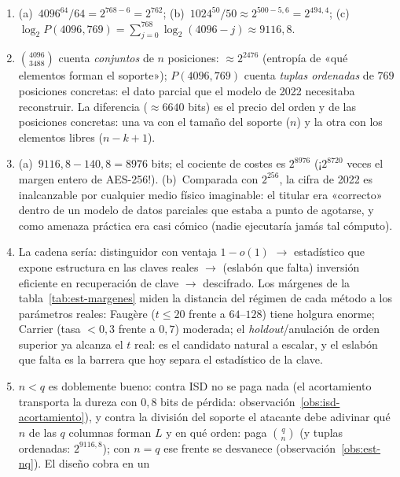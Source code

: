 \begin{enumerate}[leftmargin=1.9em,itemsep=4pt]
  \item (a)~$4096^{64}/64=2^{768-6}=2^{762}$;
        (b)~$1024^{50}/50\approx2^{500-5{,}6}=2^{494{,}4}$;
        (c)~$\log_2P(4096,769)=\sum_{j=0}^{768}\log_2(4096-j)
        \approx9116{,}8$.
  \item $\binom{4096}{3488}$ cuenta \emph{conjuntos} de $n$
        posiciones: $\approx2^{2476}$ (entropía de «qué elementos
        forman el soporte»); $P(4096,769)$ cuenta \emph{tuplas
        ordenadas} de $769$ posiciones concretas: el dato parcial
        que el modelo de 2022 necesitaba reconstruir. La diferencia
        ($\approx6640$ bits) es el precio del orden y de las
        posiciones concretas: una va con el tamaño del soporte
        ($n$) y la otra con los elementos libres ($n-k+1$).
  \item (a)~$9116{,}8-140{,}8=8976$ bits; el cociente de costes es
        $2^{8976}$ (¡$2^{8720}$ veces el margen entero de
        AES-256!). (b)~Comparada con $2^{256}$, la cifra de 2022 es
        inalcanzable por cualquier medio físico imaginable: el
        titular era «correcto» dentro de un modelo de datos
        parciales que estaba a punto de agotarse, y como amenaza
        práctica era casi cómico (nadie ejecutaría jamás tal
        cómputo).
  \item La cadena sería: distinguidor con ventaja $1-o(1)$
        $\to$ estadístico que expone estructura en las claves
        reales $\to$ (eslabón que falta) inversión eficiente en
        recuperación de clave $\to$ descifrado. Los márgenes de
        la tabla~\ref{tab:est-margenes} miden la distancia del régimen de
        cada método a los parámetros reales: Faugère ($t\le20$
        frente a $64$--$128$) tiene holgura enorme; Carrier
        (tasa $<0{,}3$ frente a $0{,}7$) moderada; el
        \emph{holdout}/anulación de orden superior ya alcanza el
        $t$ real: es el candidato natural a escalar, y el eslabón
        que falta es la barrera que hoy separa el estadístico de
        la clave.
  \item $n<q$ es doblemente bueno: contra ISD no se paga nada
        (el acortamiento transporta la dureza con $0{,}8$ bits de
        pérdida: observación~\ref{obs:isd-acortamiento}), y contra
        la división del soporte el atacante debe adivinar qué $n$
        de las $q$ columnas forman $L$ y en qué orden: paga
        $\binom{q}{n}$ (y tuplas ordenadas: $2^{9116{,}8}$); con
        $n=q$ ese frente se desvanece
        (observación~\ref{obs:est-nq}). El diseño cobra en un

\end{enumerate}
